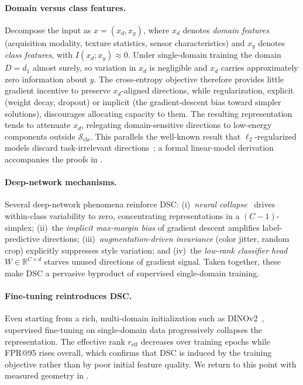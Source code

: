 \paragraph{Domain versus class features.}
Decompose the input as $x = (x_d, x_y)$, where $x_d$ denotes \emph{domain features} (acquisition modality, texture statistics, sensor characteristics) and $x_y$ denotes \emph{class features}, with $I(x_d; x_y) \approx 0$. Under single-domain training the domain $D = d_1$ almost surely, so variation in $x_d$ is negligible and $x_d$ carries approximately zero information about $y$. The cross-entropy objective therefore provides little gradient incentive to preserve $x_d$-aligned directions, while regularization, explicit (weight decay, dropout) or implicit (the gradient-descent bias toward simpler solutions), discourages allocating capacity to them. The resulting representation tends to attenuate $x_d$, relegating domain-sensitive directions to low-energy components outside $\mathcal{S}_{\mathrm{cls}}$. This parallels the well-known result that $\ell_2$-regularized models discard task-irrelevant directions~\citep{Jing2022rank}; a formal linear-model derivation accompanies the proofs in .

\paragraph{Deep-network mechanisms.}
Several deep-network phenomena reinforce DSC: (i)~\emph{neural collapse}~\citep{Papyan2020nc} drives within-class variability to zero, concentrating representations in a $(C{-}1)$-simplex; (ii)~the \emph{implicit max-margin bias} of gradient descent amplifies label-predictive directions; (iii)~\emph{augmentation-driven invariance} (color jitter, random crop) explicitly suppresses style variation; and (iv)~the \emph{low-rank classifier head} $W \in \mathbb{R}^{C \times d}$ starves unused directions of gradient signal. Taken together, these make DSC a pervasive byproduct of supervised single-domain training.

\paragraph{Fine-tuning reintroduces DSC.}
Even starting from a rich, multi-domain initialization such as DINOv2~\citep{oquab2023dinov2}, supervised fine-tuning on single-domain data progressively collapses the representation. The effective rank $r_{\mathrm{eff}}$ decreases over training epochs while FPR@95 rises overall, which confirms that DSC is induced by the training objective rather than by poor initial feature quality. We return to this point with measured geometry in .

